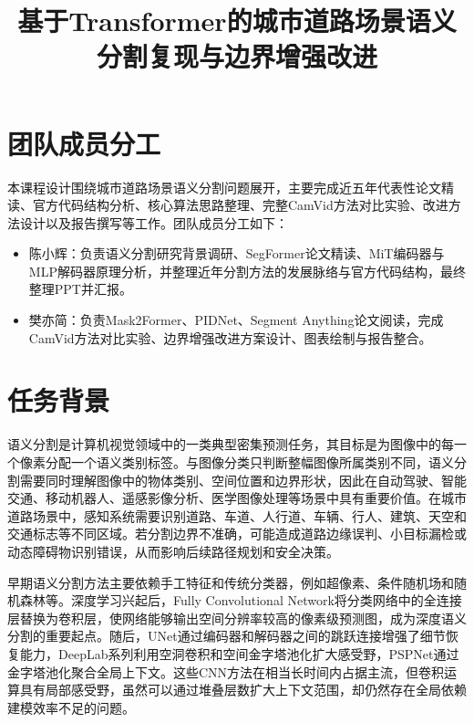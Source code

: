 \documentclass{report}
\title{基于Transformer的城市道路场景语义分割复现与边界增强改进}
\begin{document}
\maketitle

\pagestyle{plain}
\tableofcontents
\newpage
\pagestyle{plain}

\setcounter{page}{1}

\section{团队成员分工}

本课程设计围绕城市道路场景语义分割问题展开，主要完成近五年代表性论文精读、官方代码结构分析、核心算法思路整理、完整CamVid方法对比实验、改进方法设计以及报告撰写等工作。团队成员分工如下：

\begin{itemize}
    \item 陈小辉：负责语义分割研究背景调研、SegFormer论文精读、MiT编码器与MLP解码器原理分析，并整理近年分割方法的发展脉络与官方代码结构，最终整理PPT并汇报。
    \item 樊亦简：负责Mask2Former、PIDNet、Segment Anything论文阅读，完成CamVid方法对比实验、边界增强改进方案设计、图表绘制与报告整合。
\end{itemize}


\section{任务背景}

语义分割是计算机视觉领域中的一类典型密集预测任务，其目标是为图像中的每一个像素分配一个语义类别标签。与图像分类只判断整幅图像所属类别不同，语义分割需要同时理解图像中的物体类别、空间位置和边界形状，因此在自动驾驶、智能交通、移动机器人、遥感影像分析、医学图像处理等场景中具有重要价值。在城市道路场景中，感知系统需要识别道路、车道、人行道、车辆、行人、建筑、天空和交通标志等不同区域。若分割边界不准确，可能造成道路边缘误判、小目标漏检或动态障碍物识别错误，从而影响后续路径规划和安全决策。

早期语义分割方法主要依赖手工特征和传统分类器，例如超像素、条件随机场和随机森林等。深度学习兴起后，Fully Convolutional Network将分类网络中的全连接层替换为卷积层，使网络能够输出空间分辨率较高的像素级预测图，成为深度语义分割的重要起点。随后，UNet通过编码器和解码器之间的跳跃连接增强了细节恢复能力，DeepLab系列利用空洞卷积和空间金字塔池化扩大感受野，PSPNet通过金字塔池化聚合全局上下文。这些CNN方法在相当长时间内占据主流，但卷积运算具有局部感受野，虽然可以通过堆叠层数扩大上下文范围，却仍然存在全局依赖建模效率不足的问题。
\end{document}
